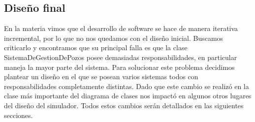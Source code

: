 \subsection{Diseño final}

En la materia vimos que el desarrollo de software se hace de manera iterativa incremental, por lo que no nos quedamos con el diseño inicial. Buscamos criticarlo y encontramos que su principal falla es que la clase SistemaDeGestionDePozos posee demasiadas responsabilidades, en particular maneja la mayor parte del sistema. Para solucionar este problema decidimos plantear un diseño en el que se posean varios sistemas todos con responsabilidades completamente distintas. Dado que este cambio se realizó en la clase más importante del diagrama de clases nos impactó en algunos otros lugares del diseño del simulador. Todos estos cambios serán detallados en las siguientes secciones.
